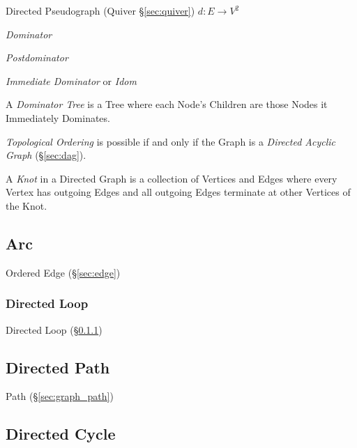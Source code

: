 Directed Pseudograph (Quiver \S\ref{sec:quiver}) $d : E \rightarrow
V^2$



\emph{Dominator}

\emph{Postdominator}

\emph{Immediate Dominator} or \emph{Idom}

A \emph{Dominator Tree} is a Tree where each Node's Children are those
Nodes it Immediately Dominates.

\emph{Topological Ordering} is possible if and only if the Graph is a
\emph{Directed Acyclic Graph} (\S\ref{sec:dag}).

A \emph{Knot} in a Directed Graph is a collection of Vertices and
Edges where every Vertex has outgoing Edges and all outgoing Edges
terminate at other Vertices of the Knot.



\subsection{Arc}\label{sec:arc}

Ordered Edge (\S\ref{sec:edge})



\subsubsection{Directed Loop}\label{sec:directed_loop}

Directed Loop (\S\ref{sec:directed_loop})



\subsection{Directed Path}\label{sec:directed_path}

Path (\S\ref{sec:graph_path})



\subsection{Directed Cycle}\label{sec:directed_cycle}

